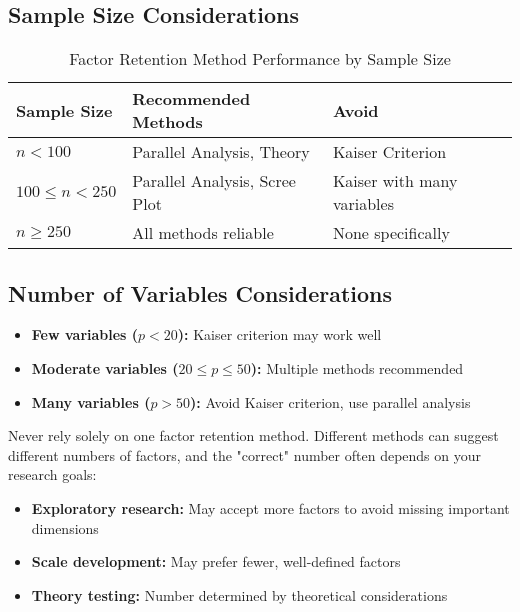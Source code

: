 \documentclass[a4paper]{tufte-book}
\begin{document}
\subsection{Sample Size Considerations}

\begin{table}[h]
\centering
\caption{Factor Retention Method Performance by Sample Size}
\begin{tabular}{@{}lll@{}}
\toprule
\textbf{Sample Size} & \textbf{Recommended Methods} & \textbf{Avoid} \\
\midrule
$n < 100$ & Parallel Analysis, Theory & Kaiser Criterion \\
$100 \leq n < 250$ & Parallel Analysis, Scree Plot & Kaiser with many variables \\
$n \geq 250$ & All methods reliable & None specifically \\
\bottomrule
\end{tabular}
\end{table}

\subsection{Number of Variables Considerations}

\begin{itemize}
\item \textbf{Few variables ($p < 20$):} Kaiser criterion may work well
\item \textbf{Moderate variables ($20 \leq p \leq 50$):} Multiple methods recommended
\item \textbf{Many variables ($p > 50$):} Avoid Kaiser criterion, use parallel analysis
\end{itemize}

\begin{commonmistake}
Never rely solely on one factor retention method. Different methods can suggest different numbers of factors, and the "correct" number often depends on your research goals:
\begin{itemize}
\item \textbf{Exploratory research:} May accept more factors to avoid missing important dimensions
\item \textbf{Scale development:} May prefer fewer, well-defined factors
\item \textbf{Theory testing:} Number determined by theoretical considerations
\end{itemize}
\end{commonmistake}
\end{document}
